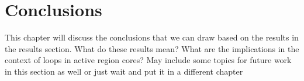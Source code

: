 \chapter{Conclusions}
\label{ch:conclusions}
This chapter will discuss the conclusions that we can draw based on the results in the results section. What do these results mean? What are the implications in the context of loops in active region cores?
May include some topics for future work in this section as well or just wait and put it in a different chapter